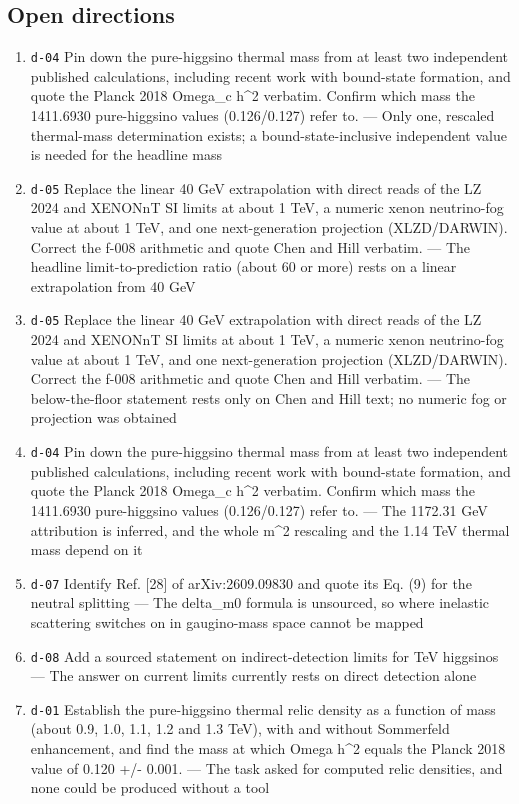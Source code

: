 \documentclass[11pt,a4paper]{article}
\begin{document}
\subsection{Open directions}
\begin{enumerate}
  \item \texttt{d-04} Pin down the pure-higgsino thermal mass from at least two independent published calculations, including recent work with bound-state formation, and quote the Planck 2018 Omega\_c h\textasciicircum{}2 verbatim. Confirm which mass the 1411.6930 pure-higgsino values (0.126/0.127) refer to. --- Only one, rescaled thermal-mass determination exists; a bound-state-inclusive independent value is needed for the headline mass
  \item \texttt{d-05} Replace the linear 40 GeV extrapolation with direct reads of the LZ 2024 and XENONnT SI limits at about 1 TeV, a numeric xenon neutrino-fog value at about 1 TeV, and one next-generation projection (XLZD/DARWIN). Correct the f-008 arithmetic and quote Chen and Hill verbatim. --- The headline limit-to-prediction ratio (about 60 or more) rests on a linear extrapolation from 40 GeV
  \item \texttt{d-05} Replace the linear 40 GeV extrapolation with direct reads of the LZ 2024 and XENONnT SI limits at about 1 TeV, a numeric xenon neutrino-fog value at about 1 TeV, and one next-generation projection (XLZD/DARWIN). Correct the f-008 arithmetic and quote Chen and Hill verbatim. --- The below-the-floor statement rests only on Chen and Hill text; no numeric fog or projection was obtained
  \item \texttt{d-04} Pin down the pure-higgsino thermal mass from at least two independent published calculations, including recent work with bound-state formation, and quote the Planck 2018 Omega\_c h\textasciicircum{}2 verbatim. Confirm which mass the 1411.6930 pure-higgsino values (0.126/0.127) refer to. --- The 1172.31 GeV attribution is inferred, and the whole m\textasciicircum{}2 rescaling and the 1.14 TeV thermal mass depend on it
  \item \texttt{d-07} Identify Ref. [28] of arXiv:2609.09830 and quote its Eq. (9) for the neutral splitting --- The delta\_m0 formula is unsourced, so where inelastic scattering switches on in gaugino-mass space cannot be mapped
  \item \texttt{d-08} Add a sourced statement on indirect-detection limits for TeV higgsinos --- The answer on current limits currently rests on direct detection alone
  \item \texttt{d-01} Establish the pure-higgsino thermal relic density as a function of mass (about 0.9, 1.0, 1.1, 1.2 and 1.3 TeV), with and without Sommerfeld enhancement, and find the mass at which Omega h\textasciicircum{}2 equals the Planck 2018 value of 0.120 +/- 0.001. --- The task asked for computed relic densities, and none could be produced without a tool
\end{enumerate}
\end{document}
